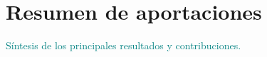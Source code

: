 \section{Resumen de aportaciones}
\textcolor{teal}{Síntesis de los principales resultados y contribuciones.}
